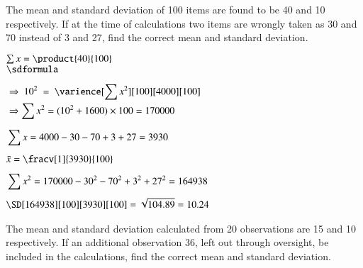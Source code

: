 \documentclass[12pt]{article}
\begin{document}

\textbf{} The mean and standard deviation of 100 items are found to be 40 and 10 respectively. If at the time of calculations two items are wrongly taken as 30 and 70 instead of 3 and 27, find the correct mean and standard deviation.

\vspace{-0.5\baselineskip}
\begin{minipage}[t]{0.49\linewidth}
   $\sum{x} = \product{40}{100}$\\[1ex]
   $\begin{aligned}
      &\sdformula\\[1ex]
      &\Rightarrow \ 10^2 \ = \ \varience[\sum{x^2}][100][4000][100]\\
      &\Rightarrow \sum{x^2} = (10^2 + 1600) \times 100 = 170000\\
   \end{aligned}$
\end{minipage}\vrule\hspace{1ex}
\begin{minipage}[t]{0.49\linewidth}
   $\begin{aligned}
      &\sum{x} = 4000-30-70+3+27 = 3930\\[1ex]
      &\bar{x} = \fracv[1]{3930}{100}\\[1ex]
      &\sum{x^2} = 170000-30^2-70^2+3^2+27^2 = 164938\\[1ex]
      &\SD[164938][100][3930][100] = \sqrt{104.89} = 10.24\\
   \end{aligned}$
\end{minipage}

\vspace{5ex}
\textbf{} The mean and standard deviation calculated from 20 observations are 15 and 10 respectively. If an additional observation 36, left out through oversight, be included in the calculations, find the correct mean and standard deviation.
\end{document}
